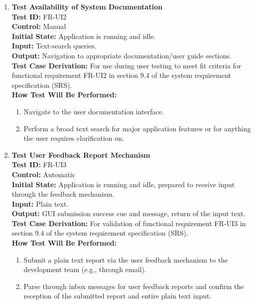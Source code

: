 \documentclass[12pt, titlepage]{article}
\begin{document}
\begin{enumerate}
    \item \textbf{Test Availability of System Documentation} \\
      \newline
      \textbf{Test ID:} FR-UI2 \\
      \textbf{Control:} Manual \\
      \textbf{Initial State:} Application is running and idle. \\
      \textbf{Input:} Text-search queries. \\
      \textbf{Output:} Navigation to appropriate documentation/user guide sections. \\
      \textbf{Test Case Derivation:} For use during user testing to meet fit criteria for functional requirement FR-UI2 in section 9.4 of the system requirement specification (SRS). \\
      \textbf{How Test Will Be Performed:}
      \begin{enumerate}
          \item Navigate to the user documentation interface.
          \item Perform a broad text search for major application features or for anything the user requires clarification on.
      \end{enumerate}
    
    \item \textbf{Test User Feedback Report Mechanism} \\
      \newline
      \textbf{Test ID:} FR-UI3 \\
      \textbf{Control:} Automatic \\
      \textbf{Initial State:} Application is running and idle, prepared to receive input through the feedback mechanism. \\
      \textbf{Input:} Plain text. \\
      \textbf{Output:} GUI submission success cue and message, return of the input text. \\
      \textbf{Test Case Derivation:} For validation of functional requirement FR-UI3 in section 9.4 of the system requirement specification (SRS). \\
      \textbf{How Test Will Be Performed:}
      \begin{enumerate}
          \item Submit a plain text report via the user feedback mechanism to the development team (e.g., through email).
          \item Parse through inbox messages for user feedback reports and confirm the reception of the submitted report and entire plain text input.
      \end{enumerate}
  \end{enumerate}
\end{document}
